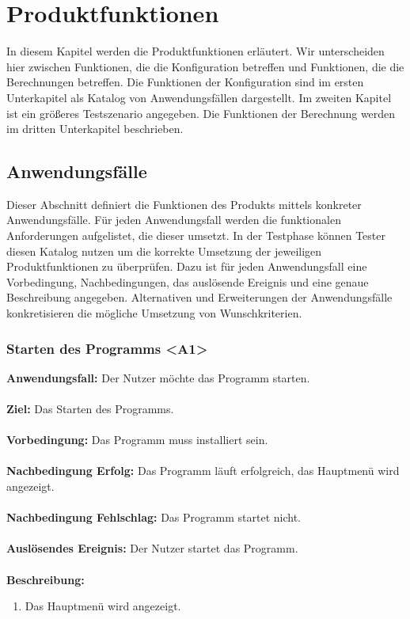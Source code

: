 \documentclass[parskip=full]{scrartcl} %
\begin{document}
\section{Produktfunktionen}
In diesem Kapitel werden die Produktfunktionen erläutert. Wir unterscheiden hier zwischen Funktionen, die die Konfiguration betreffen und Funktionen, die die Berechnungen betreffen. Die Funktionen der Konfiguration sind im ersten Unterkapitel als Katalog von Anwendungsfällen dargestellt. Im zweiten Kapitel ist ein größeres Testszenario angegeben. Die Funktionen der Berechnung werden im dritten Unterkapitel beschrieben.

\subsection{Anwendungsfälle}
Dieser Abschnitt definiert die Funktionen des Produkts mittels konkreter Anwendungsfälle. Für jeden Anwendungsfall werden die funktionalen Anforderungen aufgelistet, die dieser umsetzt. In der Testphase können Tester diesen Katalog nutzen um die korrekte Umsetzung der jeweiligen Produktfunktionen zu überprüfen. Dazu ist für jeden Anwendungsfall eine Vorbedingung, Nachbedingungen, das auslösende Ereignis und eine genaue Beschreibung angegeben. Alternativen und Erweiterungen der Anwendungsfälle konkretisieren die mögliche Umsetzung von Wunschkriterien.
\newpage


\subsubsection*{Starten des Programms <A1>}
\textbf{Anwendungsfall:}  Der Nutzer möchte das Programm starten.\\\\
\textbf{Ziel:} Das Starten des Programms. \\\\
\textbf{Vorbedingung:} Das Programm muss installiert sein.  \\\\
\textbf{Nachbedingung Erfolg:} Das Programm läuft erfolgreich, das Hauptmenü wird angezeigt.\\\\
\textbf{Nachbedingung Fehlschlag:} Das Programm startet nicht. \\\\
\textbf{Auslösendes Ereignis:} Der Nutzer startet das Programm. \\\\
\textbf{Beschreibung:}
\begin{enumerate}
    \item Das Hauptmenü wird angezeigt.
\end{enumerate}
\newpage
\end{document}
